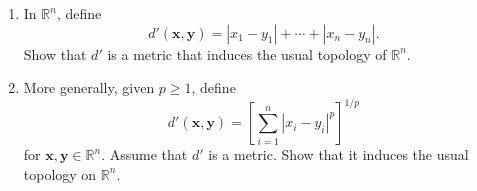 \documentclass[a4paper,10pt]{article}
\newcommand{\bx}{\mathbf{x}}
\newcommand{\by}{\mathbf{y}}
\newcommand{\RR}{\mathbb{R}}
\begin{document}
\begin{exercise}[ID=2.20.1]
    \begin{enumerate}[label={(\alph*)}, align=left, leftmargin=\parindent, listparindent=\parindent, labelwidth=0pt, itemindent=!]
        \item In $\RR^n$, define
        \begin{equation*}
            d'(\bx, \by) = |x_1 - y_1| + \cdots + |x_n - y_n|.
        \end{equation*}
        Show that $d'$ is a metric that induces the usual topology of $\RR^n$.
        \item  More generally, given $p \geq 1$, define
        \begin{equation*}
            d'(\bx, \by) = \left[\sum_{i=1}^n |x_i - y_i|^p\right]^{1/p}
        \end{equation*}
        for $\bx, \by \in \RR^n$.
        Assume that $d'$ is a metric.
        Show that it induces the usual topology on $\RR^n$.
    \end{enumerate}
\end{exercise}
\end{document}
